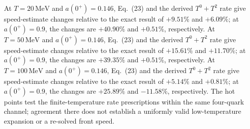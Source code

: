 At \(T=20\,\mathrm{MeV}\) and \(a(0^+)=0.146\), Eq.~(23) and the derived \(T^0+T^2\) rate give speed-estimate changes relative to the exact result of \(+9.51\%\) and \(+6.09\%\); at \(a(0^+)=0.9\), the changes are \(+40.90\%\) and \(+0.51\%\), respectively.
At \(T=50\,\mathrm{MeV}\) and \(a(0^+)=0.146\), Eq.~(23) and the derived \(T^0+T^2\) rate give speed-estimate changes relative to the exact result of \(+15.61\%\) and \(+11.70\%\); at \(a(0^+)=0.9\), the changes are \(+39.35\%\) and \(+0.51\%\), respectively.
At \(T=100\,\mathrm{MeV}\) and \(a(0^+)=0.146\), Eq.~(23) and the derived \(T^0+T^2\) rate give speed-estimate changes relative to the exact result of \(+5.14\%\) and \(+0.81\%\); at \(a(0^+)=0.9\), the changes are \(+25.89\%\) and \(-11.58\%\), respectively.
The hot points test the finite-temperature rate prescriptions within the same four-quark channel; agreement there does not establish a uniformly valid low-temperature expansion or a re-solved front speed.
